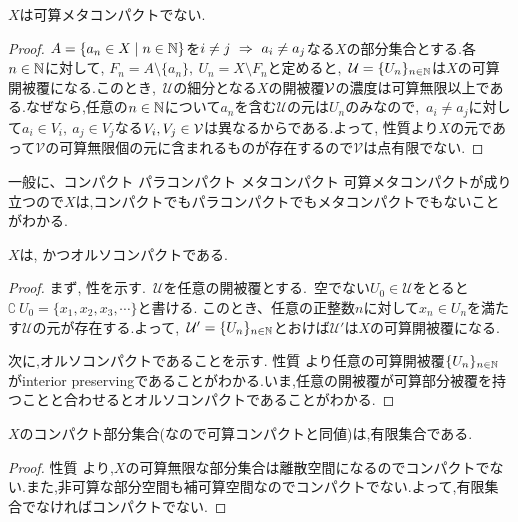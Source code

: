 \documentclass[uplatex, dvipdfmx, a4paper, 12pt, class=jsbook, crop=false]{standalone}
\begin{document}
\begin{property}
	$X$は可算メタコンパクトでない.
\end{property}

\begin{proof}
	$A=\setcomp{a_n\in X}{n \in \N}$を$i \neq j\ \Rightarrow\ a_i\neq a_j$なる$X$の部分集合とする.各$n \in \mathbb{N}$に対して, $F_n = A \setminus \{a_n\},\ U_n = X \setminus F_n$と定めると,\ $\mathcal{U} = \{U_n\}_{n\in\mathbb{N}}$は$X$の可算開被覆になる.このとき,\ $\mathcal{U}$の細分となる$X$の開被覆${\cal V}$の濃度は可算無限以上である.なぜなら,任意の$n\in\mathbb{N}$について$a_n$を含む$\mathcal{U}$の元は$U_n$のみなので,\ $a_i\neq a_j$に対して$a_i\in V_i,\ a_j\in V_j$なる$V_i,V_j\in{\cal V}$は異なるからである.よって, 性質より$X$の元であって$\mathcal{V}$の可算無限個の元に含まれるものが存在するので$\mathcal{V}$は点有限でない.
\end{proof}

一般に、コンパクト \rimp パラコンパクト \rimp メタコンパクト \rimp 可算メタコンパクトが成り立つので$X$は,コンパクトでもパラコンパクトでもメタコンパクトでもないことがわかる.

\begin{property}
	$X$は, \Lindelof かつオルソコンパクトである.
\end{property}

\begin{proof}
	まず, \Lindelof 性を示す.\ $\mathcal{U}$を任意の開被覆とする.\ 空でない$U_0\in \mathcal{U}$をとると$\complement\ U_0=\{x_1,x_2,x_3,\cdots\}$と書ける.
	このとき、任意の正整数$n$に対して$x_n\in U_n$を満たす$\mathcal{U}$の元が存在する.よって,\ $\mathcal{U}'=\{U_n\}_{n\in\mathbb{N}}$とおけば$\mathcal{U}'$は$X$の可算開被覆になる.
	
	次に,オルソコンパクトであることを示す. 性質  より任意の可算開被覆$\{U_n\}_{n\in\mathbb{N}}$がinterior preservingであることがわかる.いま,任意の開被覆が可算部分被覆を持つことと合わせるとオルソコンパクトであることがわかる.
\end{proof}

\begin{property}
	$X$のコンパクト部分集合(\Lindelof なので可算コンパクトと同値)は,有限集合である.
\end{property}

\begin{proof}
	性質  より,$X$の可算無限な部分集合は離散空間になるのでコンパクトでない.また,非可算な部分空間も補可算空間なのでコンパクトでない.よって,有限集合でなければコンパクトでない.
\end{proof}
\end{document}
